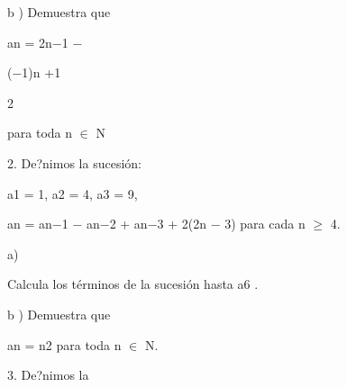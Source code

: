 \documentclass[a4paper,portrait,12pt]{article}
\begin{document}
\begin{flushleft}
b ) Demuestra que
\end{flushleft}


\begin{flushleft}
an = 2n$-$1 $-$
\end{flushleft}





\begin{flushleft}
($-$1)n +1
\end{flushleft}


2





\begin{flushleft}
para toda n $\in$ N
\end{flushleft}





\begin{flushleft}
2. De?nimos la sucesi\'{o}n:
\end{flushleft}


\begin{flushleft}
a1 = 1, a2 = 4, a3 = 9,
\end{flushleft}


\begin{flushleft}
an = an$-$1 $-$ an$-$2 + an$-$3 + 2(2n $-$ 3) para cada n $\geq$ 4.
\end{flushleft}


\begin{flushleft}
a)
\end{flushleft}





\begin{flushleft}
Calcula los t\'{e}rminos de la sucesi\'{o}n hasta a6 .
\end{flushleft}


\begin{flushleft}
b ) Demuestra que
\end{flushleft}


\begin{flushleft}
an = n2 para toda n $\in$ N.
\end{flushleft}





\begin{flushleft}
3. De?nimos la
\end{flushleft}
\end{document}
